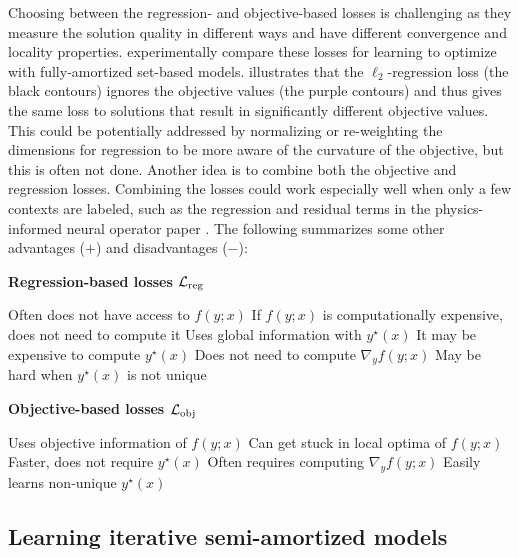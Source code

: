 Choosing between the regression- and objective-based losses
is challenging as they measure the solution quality in
different ways and have different convergence and
locality properties.
\citet{liu2022teaching} experimentally compare these
losses for learning to optimize with fully-amortized set-based models.
 illustrates that the $\ell_2$-regression
loss (the black contours) ignores the objective
values (the purple contours) and thus gives the same loss
to solutions that result in significantly different
objective values.
This could be potentially addressed by normalizing or
re-weighting the dimensions for regression to be more aware
of the curvature of the objective, but this is often not done.
Another idea is to combine both the objective and regression losses.
Combining the losses could work especially well when only a
few contexts are labeled, such as the regression and residual terms
in the physics-informed neural operator paper \citep{li2021physics}.
The following summarizes some other advantages ($+$) and
disadvantages ($-$):
\vspace{2mm}

\noindent\begin{minipage}[t]{2.7in}
\noindent\textbf{Regression-based losses ${\mathcal{L}}_{\rm reg}$}
\begin{itemize}[leftmargin=*,noitemsep]
\con Often does not have access to $f(y; x)$
\pro If $f(y; x)$ is computationally expensive, does not need to compute it
\pro Uses global information with $y^\star(x)$
\con It may be expensive to compute $y^\star(x)$
\pro Does not need to compute $\nabla_y f(y; x)$
\con May be hard when $y^\star(x)$ is not unique
\end{itemize}
\end{minipage}\hspace{5mm}\begin{minipage}[t]{3in}
\noindent\textbf{Objective-based losses ${\mathcal{L}}_{\rm obj}$}
\begin{itemize}[leftmargin=*,noitemsep]
\pro Uses objective information of $f(y; x)$
\con Can get stuck in local optima of $f(y; x)$
\pro Faster, does not require $y^\star(x)$
\con Often requires computing $\nabla_y f(y; x)$
\pro Easily learns non-unique $y^\star(x)$
\end{itemize}
\end{minipage}
\hspace{-1in}

\subsection{Learning iterative semi-amortized models}
\label{sec:learning:iter}

